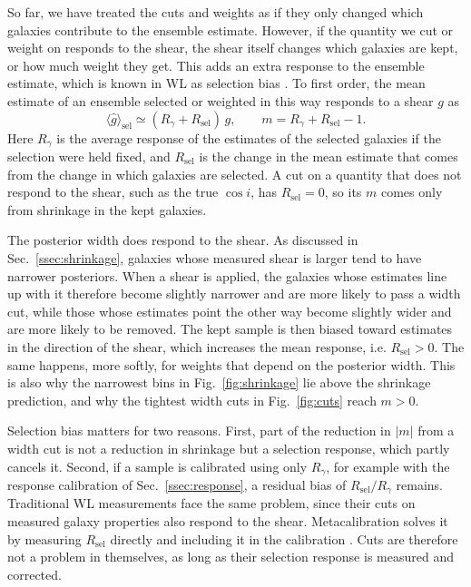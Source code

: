 
So far, we have treated the cuts and weights as if they only changed which galaxies contribute to the ensemble estimate. However, if the quantity we cut or weight on responds to the shear, the shear itself changes which galaxies are kept, or how much weight they get. This adds an extra response to the ensemble estimate, which is known in WL as selection bias \citep{MetacalPractical}. To first order, the mean estimate of an ensemble selected or weighted in this way responds to a shear $g$ as
\begin{equation}
\label{eqn:selection-response}
    \langle\hat{g}\rangle_\mathrm{sel} \simeq (R_\gamma + R_\mathrm{sel})\, g, \qquad m = R_\gamma + R_\mathrm{sel} - 1.
\end{equation}
Here $R_\gamma$ is the average response of the estimates of the selected galaxies if the selection were held fixed, and $R_\mathrm{sel}$ is the change in the mean estimate that comes from the change in which galaxies are selected. A cut on a quantity that does not respond to the shear, such as the true $\cos i$, has $R_\mathrm{sel} = 0$, so its $m$ comes only from shrinkage in the kept galaxies.

The posterior width does respond to the shear. As discussed in Sec.~\ref{ssec:shrinkage}, galaxies whose measured shear is larger tend to have narrower posteriors. When a shear is applied, the galaxies whose estimates line up with it therefore become slightly narrower and are more likely to pass a width cut, while those whose estimates point the other way become slightly wider and are more likely to be removed. The kept sample is then biased toward estimates in the direction of the shear, which increases the mean response, i.e. $R_\mathrm{sel} > 0$. The same happens, more softly, for weights that depend on the posterior width. This is also why the narrowest bins in Fig.~\ref{fig:shrinkage} lie above the shrinkage prediction, and why the tightest width cuts in Fig.~\ref{fig:cuts} reach $m > 0$.

Selection bias matters for two reasons. First, part of the reduction in $|m|$ from a width cut is not a reduction in shrinkage but a selection response, which partly cancels it. Second, if a sample is calibrated using only $R_\gamma$, for example with the response calibration of Sec.~\ref{ssec:response}, a residual bias of $R_\mathrm{sel}/R_\gamma$ remains. Traditional WL measurements face the same problem, since their cuts on measured galaxy properties also respond to the shear. Metacalibration solves it by measuring $R_\mathrm{sel}$ directly and including it in the calibration \citep{MetacalPractical, Metadet}. Cuts are therefore not a problem in themselves, as long as their selection response is measured and corrected.

